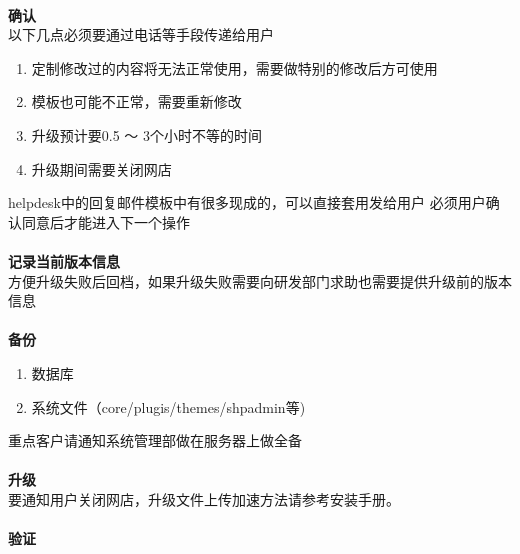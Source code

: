 \documentclass{article}
\begin{document}
\paragraph{}\textbf{确认}\\

以下几点必须要通过电话等手段传递给用户

\begin{enumerate}
\item 定制修改过的内容将无法正常使用，需要做特别的修改后方可使用
\item 模板也可能不正常，需要重新修改
\item 升级预计要0.5 ～ 3个小时不等的时间
\item 升级期间需要关闭网店
\end{enumerate}

helpdesk中的回复邮件模板中有很多现成的，可以直接套用发给用户
必须用户确认同意后才能进入下一个操作

\paragraph{}\textbf{记录当前版本信息}\\

方便升级失败后回档，如果升级失败需要向研发部门求助也需要提供升级前的版本信息

\paragraph{}\textbf{备份}\\

\begin{enumerate}
\item 数据库
\item 系统文件（core/plugis/themes/shpadmin等)
\end{enumerate}

重点客户请通知系统管理部做在服务器上做全备

\paragraph{}\textbf{升级}\\

要通知用户关闭网店，升级文件上传加速方法请参考安装手册。

\paragraph{}\textbf{验证}\\
\end{document}
